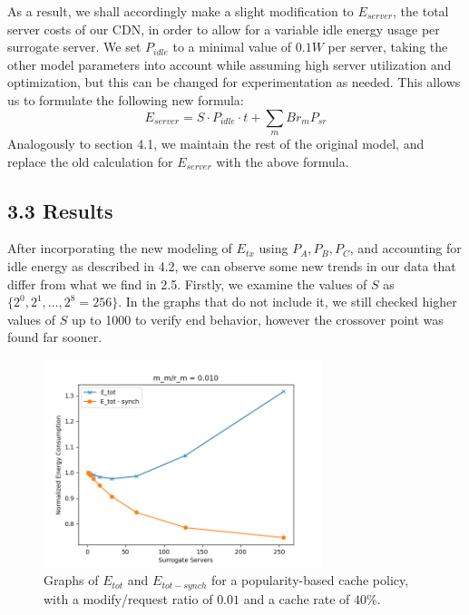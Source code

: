 \documentclass[
	a4paper, %
	10pt, %
	unnumberedsections, %
	twoside, %
]{LTJournalArticle}
\begin{document}
As a result, we shall accordingly make a slight modification to $E_{server}$, the total server costs of our CDN, in order to allow for a variable idle energy usage per surrogate server. We set $P_{idle}$ to a minimal value of $0.1W$ per server, taking the other model parameters into account while assuming high server utilization and optimization, but this can be changed for experimentation as needed. This allows us to formulate the following new formula:
\[E_{server} = S\cdot P_{idle}\cdot t + \sum_mBr_mP_{sr}\]
Analogously to section 4.1, we maintain the rest of the original model, and replace the old calculation for $E_{server}$ with the above formula.

\subsection{3.3 Results}
After incorporating the new modeling of $E_{tx}$ using $P_A, P_B, P_C$, and accounting for idle energy as described in 4.2, we can observe some new trends in our data that differ from what we find in 2.5. Firstly, we examine the values of $S$ as $\{2^0, 2^1, \ldots, 2^8 = 256\}$. In the graphs that do not include it, we still checked higher values of $S$ up to 1000 to verify end behavior, however the crossover point was found far sooner. 
\begin{figure}[!hbt]
	\begin{center}
		\includegraphics[width=8.1cm]{plots/new0.01.png}
	\end{center}
	\caption{Graphs of $E_{tot}$ and $E_{tot - synch}$ for a popularity-based cache policy, with a modify/request ratio of $0.01$ and a cache rate of $40\%$.}	
\label{new0.01}
\end{figure}
\end{document}

